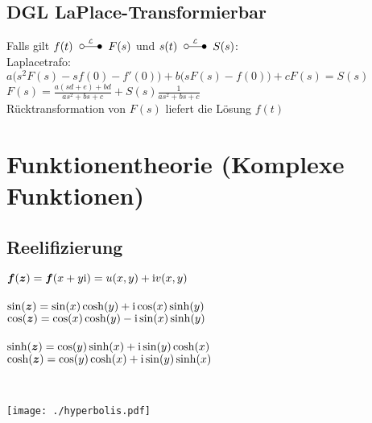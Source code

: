 \documentclass[german,color]{latex4ei/latex4ei_fs}
\begin{document}
\begin{sectionbox}
	\subsection{DGL LaPlace-Transformierbar}
	Falls gilt $f(t) \LT F(s)$ und $s(t) \LT S(s)$: \\
	Laplacetrafo: $a\bigl(s^2 F(s) - sf(0) - f'(0)\bigr) + b\bigl( s F(s) - f(0) \bigr) + c F(s) = S(s)$\\
	$F(s) = \frac{a(sd + e) + bd}{as^2 + bs +c} + S(s) \frac{1}{as^2 + bs +c}$ \\
	Rücktransformation von $F(s)$ liefert die Lösung $f(t)$
\end{sectionbox}



\section{Funktionentheorie (Komplexe Funktionen)}
\begin{sectionbox}
	\subsection{Reelifizierung}
	\parbox{6cm}{
		$\boldsymbol{f}(\boldsymbol{z}) = \boldsymbol{f}(x+y \mathrm{i}) = u(x,y) + \mathrm{i} v(x,y)$\\
		\\
		$\sin(\boldsymbol{z}) = \sin(x)\cosh(y) + \mathrm{i} \cos(x)\sinh(y)$\\
		$\cos(\boldsymbol{z}) = \cos(x)\cosh(y) - \mathrm{i} \sin(x)\sinh(y)$\\
		\\
		$\sinh(\boldsymbol{z}) = \cos(y) \sinh(x) + \mathrm{i} \sin(y) \cosh(x)$\\
		$\cosh(\boldsymbol{z}) = \cos(y) \cosh(x) + \mathrm{i} \sin(y) \sinh(x)$ }\ 
	\parbox{4cm}{\texttt{[image: ./hyperbolis.pdf]} }
\end{sectionbox}
\end{document}
